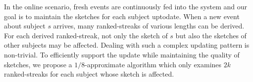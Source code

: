 In the online scenario, fresh events are continuously fed into the system and our goal is to maintain the sketches for each subject uptodate. When a new event about subject $s$ arrives, many ranked-streaks of various lengths can be derived. For each derived ranked-streak,
not only the sketch of $s$ but also the sketches
of other subjects may be affected. Dealing with such a complex updating pattern is non-trivial. 
To efficiently support the update while maintaining the quality of sketches, we propose a $1/8$-approximate algorithm which only   
examines $2k$ ranked-streaks for each subject whose sketch is affected. 









